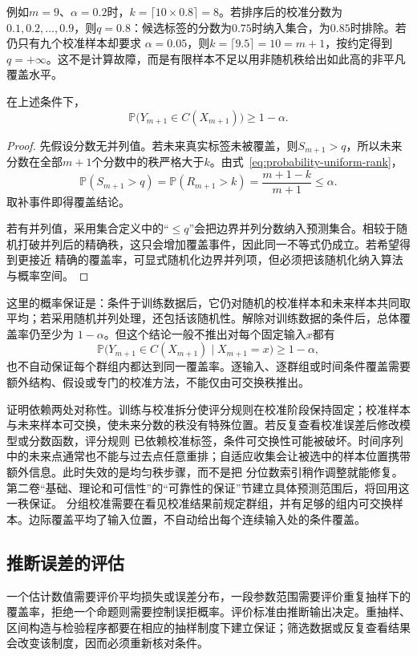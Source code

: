 例如\(m=9\)、\(\alpha=0.2\)时，\(k=\lceil10\times0.8\rceil=8\)。若排序后的校准分数为
\(0.1,0.2,\ldots,0.9\)，则\(q=0.8\)：候选标签的分数为\(0.75\)时纳入集合，为\(0.85\)时排除。若仍只有九个校准样本却要求
\(\alpha=0.05\)，则\(k=\lceil9.5\rceil=10=m+1\)，按约定得到\(q=+\infty\)。这不是计算故障，而是有限样本不足以用非随机秩给出如此高的非平凡覆盖水平。

\begin{theorem}[拆分共形的有限样本覆盖]
\label{thm:probability-split-conformal-coverage}
在上述条件下，
\[ \mathbb{P}\bigl(
    Y_{m+1}\in C(X_{m+1})\bigr)\geq 1-\alpha. \]
\end{theorem}

\begin{proof}
先假设分数无并列值。若未来真实标签未被覆盖，则\(S_{m+1}>q\)，所以未来分数在全部\(m+1\)个分数中的秩严格大于\(k\)。由式~\eqref{eq:probability-uniform-rank}，
\[ \mathbb{P}(S_{m+1}>q)
  =\mathbb{P}(R_{m+1}>k)=\frac{m+1-k}{m+1}\leq\alpha. \]
取补事件即得覆盖结论。

若有并列值，采用集合定义中的“\(\leq q\)”会把边界并列分数纳入预测集合。相较于随机打破并列后的精确秩，这只会增加覆盖事件，因此同一不等式仍成立。若希望得到更接近
精确的覆盖率，可显式随机化边界并列项，但必须把该随机化纳入算法与概率空间。
\end{proof}

这里的概率保证是：条件于训练数据后，它仍对随机的校准样本和未来样本共同取平均；若采用随机并列处理，还包括该随机性。解除对训练数据的条件后，总体覆盖率仍至少为
\(1-\alpha\)。但这个结论一般不推出对每个固定输入\(x\)都有
\[
  \mathbb{P}\bigl(
    Y_{m+1}\in C(X_{m+1})
    \mid X_{m+1}=x
  \bigr)
  \geq1-\alpha,
\]
也不自动保证每个群组内都达到同一覆盖率。逐输入、逐群组或时间条件覆盖需要额外结构、假设或专门的校准方法，不能仅由可交换秩推出。

证明依赖两处对称性。训练与校准拆分使评分规则在校准阶段保持固定；校准样本与未来样本可交换，使未来分数的秩没有特殊位置。若反复查看校准误差后修改模型或分数函数，评分规则
已依赖校准标签，条件可交换性可能被破坏。时间序列中的未来点通常也不能与过去点任意重排；自适应收集会让被选中的样本位置携带额外信息。此时失效的是均匀秩步骤，而不是把
分位数索引稍作调整就能修复。
{第二卷“基础、理论和可信性”的“可靠性的保证”节}建立具体预测范围后，将回用这一秩保证。
分组校准需要在看见校准结果前规定群组，并有足够的组内可交换样本。边际覆盖平均了输入位置，不自动给出每个连续输入处的条件覆盖。

\subsection{推断误差的评估}
\label{sec:stats-uncertainty-testing-selection}
一个估计数值需要评价平均损失或误差分布，一段参数范围需要评价重复抽样下的覆盖率，拒绝一个命题则需要控制误拒概率。评价标准由推断输出决定。重抽样、区间构造与检验程序都要在相应的抽样制度下建立保证；筛选数据或反复查看结果会改变该制度，因而必须重新核对条件。

